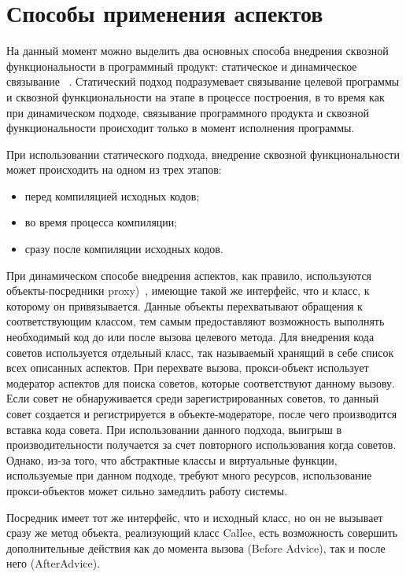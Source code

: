 \section{Способы применения аспектов}
\label{sec:aop_weaving}
На данный момент можно выделить два основных способа внедрения сквозной
функциональности в программный продукт: статическое и динамическое связывание~
\cite{static_and_dynamic_AOP}.
Статический подход подразумевает связывание целевой программы и сквозной
функциональности на этапе в процессе построения, в то время как при динамическом
подходе, связывание программного продукта и сквозной функциональности происходит
только в момент исполнения программы.

При использовании статического подхода, внедрение сквозной функциональности
может происходить на одном из трех этапов:
\begin{itemize}
  \item перед компиляцией исходных кодов;
  \item во время процесса компиляции;
  \item сразу после компиляции исходных кодов.
\end{itemize}

При динамическом способе внедрения аспектов, как правило, используются
объекты-посредники proxy)~\cite{aspect_dynamic_weavers}, имеющие такой же
интерфейс, что и класс, к которому он привязывается.
Данные объекты перехватывают обращения к соответствующим классом, тем самым
предоставляют возможность выполнять необходимый код до или после вызова целевого
метода.
Для внедрения кода советов используется отдельный класс, так называемый
 хранящий в себе список всех описанных аспектов.
При перехвате вызова, прокси-объект использует модератор аспектов для поиска
советов, которые соответствуют данному вызову.
Если совет не обнаруживается среди зарегистрированных советов, то данный совет
создается и регистрируется в объекте-модераторе, после чего производится вставка
кода совета.
При использовании данного подхода, выигрыш в производительности получается за
счет повторного использования когда советов.
Однако, из-за того, что абстрактные классы и виртуальные функции, используемые
при данном подходе, требуют много ресурсов, использование прокси-объектов может
сильно замедлить работу системы.

Посредник имеет тот же интерфейс, что и исходный класс, но он не вызывает 
сразу же метод объекта, реализующий класс Callee, есть возможность 
совершить дополнительные действия как до момента вызова (Before Advice), 
так и после него (AfterAdvice).

